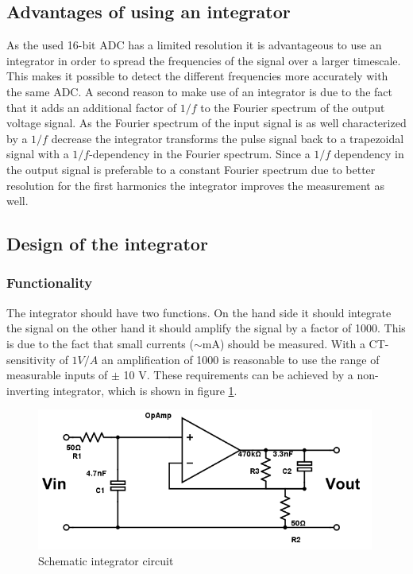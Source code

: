 \subsection{Advantages of using an integrator}
As the used 16-bit ADC has a limited resolution it is advantageous to use an integrator in order to spread the frequencies of the signal over a larger timescale. This makes it possible to detect the different frequencies more accurately with the same ADC. 
A second reason to make use of an integrator is due to the fact that it adds an additional factor of $1/f$ to the Fourier spectrum of the output voltage signal. As the Fourier spectrum of the input signal is as well characterized by a $1/f$ decrease the integrator transforms the pulse signal back to a trapezoidal signal with a $1/f$-dependency in the Fourier spectrum. Since a $1/f$ dependency in the output signal is preferable to a constant Fourier spectrum due to better resolution for the first harmonics the integrator improves the measurement as well. 

\subsection{Design of the integrator}
\subsubsection{Functionality}
The integrator should have two functions. On the hand side it should integrate the signal on the other hand it should amplify the signal by a factor of 1000. This is due to the fact that small currents ($\sim$mA) should be measured. With a CT-sensitivity of $1V/A$ an amplification of 1000 is reasonable to use the range of measurable inputs of $\pm$ 10 V. These requirements can be achieved by a non-inverting integrator, which is shown in figure  \ref{fig.circuit}. 

\begin{figure}[h!tb]
\includegraphics[width=0.99\textwidth]{figures/Method/integrator/circuit.png}
    \caption{Schematic integrator circuit}
    \label{fig.circuit}
\end{figure}	

